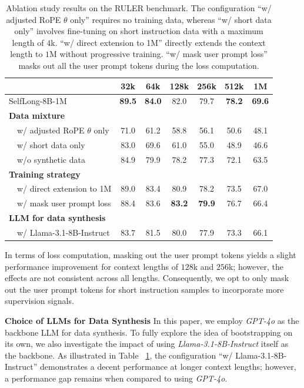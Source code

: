\documentclass{article}
\begin{document}
\begin{table}[ht]
\centering
\caption{Ablation study results on the RULER benchmark.
The configuration ``w/ adjusted RoPE $\theta$ only'' requires no training data,
whereas ``w/ short data only'' involves fine-tuning on short instruction data with a maximum length of $4$k.
``w/ direct extension to 1M'' directly extends the context length to $1$M without progressive training.
``w/ mask user prompt loss'' masks out all the user prompt tokens during the loss computation.
}
\begin{tabular}{lcccccc}
\hline
             &   32k   &    64k  & 128k   & 256k   & 512k & 1M \\ \hline
SelfLong-8B-1M   & \textbf{89.5} & \textbf{84.0} & 82.0 & 79.7 & \textbf{78.2} & \textbf{69.6} \\ \hline
\multicolumn{7}{l}{\textbf{Data mixture}}           \\
\ \ w/ adjusted RoPE $\theta$ only &   71.0  & 61.2 & 58.8  &   56.1   &  50.6    &  48.1  \\
\ \ w/ short data only  &   83.0   & 69.6  &  61.0 &   55.0   &  48.9   & 46.6   \\
\ \ w/o synthetic data &   84.9 & 79.9 & 78.2  &   77.3   &  72.1   & 63.5  \\ \hline
\multicolumn{7}{l}{\textbf{Training strategy}}    \\
\ \ w/ direct extension to 1M   &   89.0  & 83.4  & 80.9  &  78.2    &   73.5   &  67.0   \\
\ \ w/ mask user prompt loss   &  88.4   &  83.6  &  \textbf{83.2}  &  \textbf{79.9}    & 76.7   &  66.4 \\ \hline
\multicolumn{7}{l}{\textbf{LLM for data synthesis}} \\
\ \ w/ Llama-3.1-8B-Instruct   &  83.7  & 81.5  &  80.0    &   77.9     &   73.3   &   66.1 \\ \hline
\end{tabular}
\label{tab:detailed_analysis}
\end{table}

In terms of loss computation,
masking out the user prompt tokens yields a slight performance improvement for context lengths of $128$k and $256$k;
however,
the effects are not consistent across all lengths.
Consequently,
we opt to only mask out the user prompt tokens for short instruction samples
to incorporate more supervision signals.

\noindent
\textbf{Choice of LLMs for Data Synthesis }
In this paper,
we employ \emph{GPT-4o} as the backbone LLM for data synthesis.
To fully explore the idea of bootstrapping on its own,
we also investigate the impact of using \emph{Llama-3.1-8B-Instruct} itself as the backbone.
As illustrated in Table ~\ref{tab:detailed_analysis},
the configuration ``w/ Llama-3.1-8B-Instruct'' demonstrates a decent performance at longer context lengths;
however,
a performance gap remains when compared to using \emph{GPT-4o}.
\end{document}
